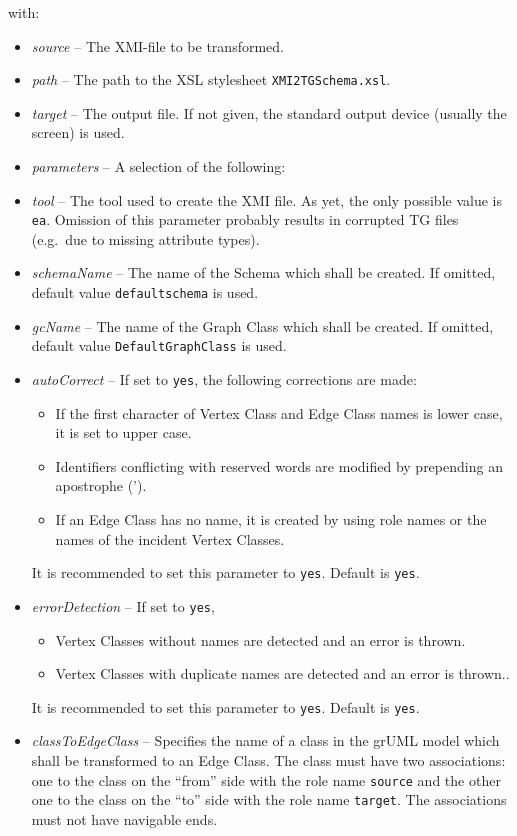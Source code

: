 \documentclass[a4paper]{article}
\begin{document}
	with:
	\begin{itemize}
		\item \emph{source} -- The XMI-file to be transformed.
		\item \emph{path} -- The path to the XSL stylesheet \texttt{XMI2TGSchema.xsl}.
		\item \emph{target} -- The output file. If not given, the standard output device (usually the screen) is used.
		\item \emph{parameters} -- A selection of the following:
		\item \emph{tool} -- The tool used to create the XMI file. As yet, the only possible value is \texttt{ea}. Omission of this parameter probably results in corrupted TG files (e.g.\ due to missing attribute types).
		\item \emph{schemaName} -- The name of the Schema which shall be created. If omitted, default value \texttt{default\-schema} is used.
		\item \emph{gcName} -- The name of the Graph Class which shall be created. If omitted, default value  \texttt{Default\-GraphClass} is used.
		\item \emph{autoCorrect} -- If set to \texttt{yes}, the following corrections are made:
		\begin{itemize}
			\item If the first character of Vertex Class and Edge Class names is lower case, it is set to upper case.
			\item Identifiers conflicting with reserved words are modified by prepending an apostrophe (').
			\item If an Edge Class has no name, it is created by using role names or the names of the incident Vertex Classes. 
		\end{itemize}
		It is recommended to set this parameter to \texttt{yes}. Default is \texttt{yes}.
		\item \emph{errorDetection} -- If set to \texttt{yes},
		\begin{itemize}
			\item Vertex Classes without names are detected and an error is thrown.
			\item Vertex Classes with duplicate names are detected and an error is thrown..
		\end{itemize}
		It is recommended to set this parameter to \texttt{yes}. Default is \texttt{yes}.
		\item \emph{classToEdgeClass} -- Specifies the name of a class in the grUML model which shall be transformed to an Edge Class. The class must have two associations: one to the class on the ``from'' side with the role name \texttt{source} and the other one to the class on the ``to'' side with the role name \texttt{target}. The associations must not have navigable ends.
	\end{itemize}

	
\end{document}
